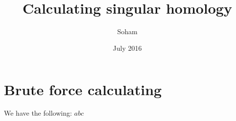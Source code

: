 \documentclass{article}
\title{Calculating singular homology}
\author{Soham}
\date{July 2016}
\theoremstyle{definition}
\begin{document}
\maketitle

\section{Brute force calculating}
We have the following:
$abc$
\end{document}
